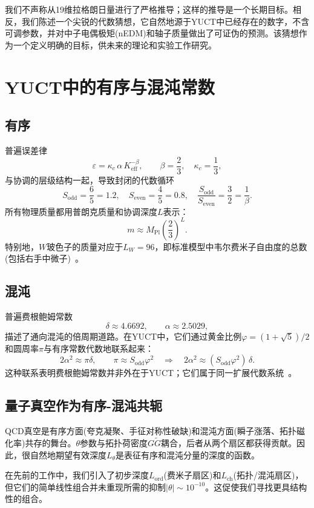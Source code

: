 \documentclass[12pt,a4paper]{article}
\begin{document}
	我们不声称从19维拉格朗日量进行了严格推导；这样的推导是一个长期目标。相反，我们陈述一个尖锐的代数猜想，它自然地源于YUCT中已经存在的数字，不含可调参数，并对中子电偶极矩(nEDM)和轴子质量做出了可证伪的预测。该猜想作为一个定义明确的目标，供未来的理论和实验工作研究。
	
	\section{YUCT中的有序与混沌常数}
	\label{sec:oc}
	
	\subsection{有序}
	普遍误差律
	\[
	\varepsilon = \kappa_c\,\alpha\,K_{\mathrm{eff}}^{-\beta},\qquad \beta = \frac{2}{3},\quad \kappa_c = \frac{1}{3},
	\]
	与协调的层级结构一起，导致封闭的代数循环
	\[
	S_{\mathrm{odd}} = \frac{6}{5} = 1.2,\quad S_{\mathrm{even}} = \frac{4}{5} = 0.8,\quad 
	\frac{S_{\mathrm{odd}}}{S_{\mathrm{even}}} = \frac{3}{2} = \frac{1}{\beta}.
	\]
	所有物理质量都用普朗克质量和协调深度\(L\)表示：
	\[
	m \approx M_{\mathrm{Pl}}\left(\frac{2}{3}\right)^L.
	\]
	特别地，\(W\)玻色子的质量对应于\(L_W = 96\)，即标准模型中韦尔费米子自由度的总数(包括右手中微子)~\cite{Y3}。
	
	\subsection{混沌}
	普遍费根鲍姆常数
	\[
	\delta \approx 4.6692,\qquad \alpha \approx 2.5029,
	\]
	描述了通向混沌的倍周期道路。在YUCT中，它们通过黄金比例\(\varphi = (1+\sqrt{5})/2\)和圆周率\(\pi\)与有序常数代数地联系起来：
	\[
	2\alpha^2 \approx \pi\delta,\qquad
	\pi \approx S_{\mathrm{odd}}\varphi^2 \quad \Longrightarrow \quad 
	2\alpha^2 \approx (S_{\mathrm{odd}}\varphi^2)\,\delta .
	\]
	这种联系表明费根鲍姆常数并非外在于YUCT；它们属于同一扩展代数系统~\cite{Y2}。
	
	\subsection{量子真空作为有序-混沌共轭}
	QCD真空是有序方面(夸克凝聚、手征对称性破缺)和混沌方面(瞬子涨落、拓扑磁化率)共存的舞台。\(\theta\)参数与拓扑荷密度\(G\widetilde{G}\)耦合，后者从两个扇区都获得贡献。因此，很自然地期望有效深度\(L_\theta\)是表征有序和混沌分量的深度的函数。
	
	在先前的工作中，我们引入了初步深度\(L_{\mathrm{ord}}\)(费米子扇区)和\(L_{\mathrm{ch}}\)(拓扑/混沌扇区)，但它们的简单线性组合并未重现所需的抑制\(|\theta| \sim 10^{-10}\)。这促使我们寻找更具结构性的组合。
	
\end{document}

